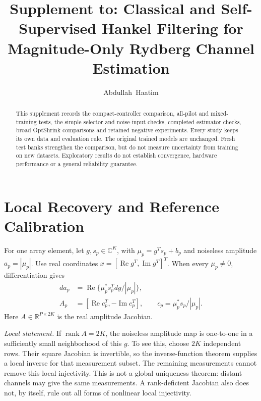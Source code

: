 \documentclass[journal]{IEEEtran}
\newcommand{\R}{\mathbb R}
\DeclareMathOperator{\rank}{rank}
\begin{document}
\title{Supplement to: Classical and Self-Supervised Hankel Filtering for Magnitude-Only Rydberg Channel Estimation}
\author{Abdullah~Haatim}
\maketitle
\begin{abstract}
This supplement records the compact-controller comparison, all-pilot and mixed-training tests, the simple selector and noise-input checks, completed
estimator checks, broad OptShrink comparisons and retained negative experiments. Every study keeps its own
data and evaluation rule. The original trained models are unchanged.
Fresh test banks strengthen the comparison, but do not measure uncertainty
from training on new datasets. Exploratory results do not establish
convergence, hardware performance or a general reliability guarantee.
\end{abstract}











\section{Local Recovery and Reference Calibration}
For one array element, let $g,s_p\in\mathbb C^K$, with
$\mu_p=g^Ts_p+b_p$ and noiseless amplitude $a_p=|\mu_p|$.
Use real coordinates $x=[\operatorname{Re}g^T,\operatorname{Im}g^T]^T$.
When every $\mu_p\ne0$, differentiation gives
\begin{align}
 da_p&=\operatorname{Re}\{\mu_p^*s_p^T dg/|\mu_p|\},\\
 A_p&=[\operatorname{Re}c_p^T,-\operatorname{Im}c_p^T],\qquad
 c_p=\mu_p^*s_p/|\mu_p|.
\end{align}
Here $A\in\R^{P\times2K}$ is the real amplitude Jacobian.

\textit{Local statement.} If $\rank A=2K$, the noiseless amplitude map
is one-to-one in a sufficiently small neighborhood of this $g$.
To see this, choose $2K$ independent rows. Their square Jacobian is
invertible, so the inverse-function theorem supplies a local inverse for
that measurement subset. The remaining measurements cannot remove this
local injectivity. This is not a global uniqueness theorem: distant
channels may give the same measurements. A rank-deficient Jacobian also
does not, by itself, rule out all forms of nonlinear local injectivity.
\end{document}
